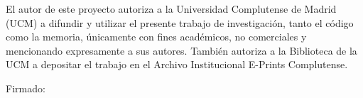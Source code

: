 
El autor de este proyecto autoriza a la Universidad Complutense de Madrid (UCM)
a difundir y utilizar el presente trabajo de investigación, tanto el código como la
memoria, únicamente con fines académicos, no comerciales y mencionando expresamente
a sus autores. También autoriza a la Biblioteca de la UCM a depositar el trabajo en el
Archivo Institucional E-Prints Complutense.


Firmado: \makeatletter\@author\makeatother